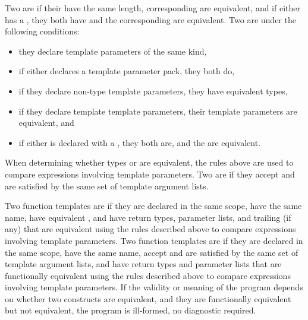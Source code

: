 \pnum
Two  are
 if
their  have the same length,
corresponding  are equivalent,
and if either has a , they both have
 and the corresponding
 are equivalent.
Two  are
under the following conditions:
\begin{itemize}
\item they declare template parameters of the same kind,
\item if either declares a template parameter pack, they both do,
\item if they declare non-type template parameters, they have
equivalent types,
\item if they declare template template parameters, their template
parameters are equivalent, and
\item if either is declared with a ,
they both are, and the  are
equivalent.
\end{itemize}
When determining whether types or 
are equivalent, the rules above are used to compare expressions
involving template parameters.
Two  are
if they accept and are satisfied by
the same set of template argument lists.

\pnum
{}%
Two function templates are
if they
are declared in the same scope,
have the same name,
have equivalent ,
and
have return types, parameter lists,
and trailing  (if any)
that are equivalent using the rules described above to compare
expressions involving
template parameters.
%
%
Two function templates are
if they
are declared in the same scope,
have the same name,
accept and are satisfied by the same set of template argument lists,
and
have return types and parameter lists that
are functionally equivalent using the rules described above to
compare expressions involving
template parameters.
If the validity or meaning of the program depends on
whether two constructs are equivalent, and they are
functionally equivalent but not equivalent, the program is ill-formed,
no diagnostic required.

